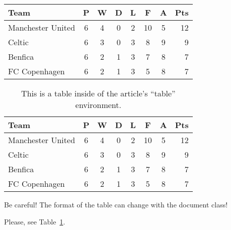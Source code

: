 \documentclass{article}
\begin{document}
\newcommand{\mytable}{\begin{tabular}{l*{6}{c}r}
  Team              & P & W & D & L & F  & A & Pts \\
  \hline
  Manchester United & 6 & 4 & 0 & 2 & 10 & 5 & 12  \\
  Celtic            & 6 & 3 & 0 & 3 &  8 & 9 &  9  \\
  Benfica           & 6 & 2 & 1 & 3 &  7 & 8 &  7  \\
  FC Copenhagen     & 6 & 2 & 1 & 3 &  5 & 8 &  7  \\
\end{tabular}}

\mytable

\begin{table}
  \begin{center}
    \mytable
  \end{center}
  \caption{This is a table inside of the article's ``table'' environment.\label{tab:table_x}}
\end{table}

Be careful! The format of the table can change with the document class!

Please, see Table~\ref{tab:table_x}.
\end{document}

